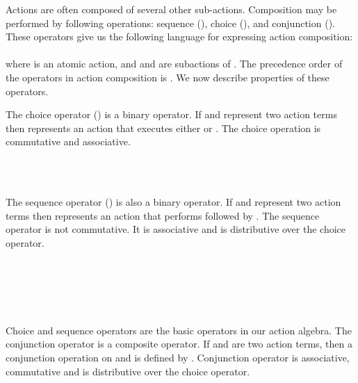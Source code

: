 \documentclass[12pt,journal,letterpaper,onecolumn]{IEEEtran}
\begin{document}
Actions are often composed of several other sub-actions. Composition
may be performed by following operations: sequence (), choice
(), and conjunction (). These operators give us the
following language for
expressing action composition: \\
\indent \\
where  is an atomic action, and  and  are subactions of
.  The precedence order of the operators in action composition is
. We now describe properties of these
operators.

The choice operator () is a binary operator. If  and
 represent two action terms then  represents an
 action  that executes either  or
. The choice operation is commutative and associative.
\begin{center}
\begin{minipage}{4.5in}
\begin{multicols}{2}
 \\
 \\

\end{multicols}
\end{minipage}
\end{center}


The sequence operator () is also a binary operator. If  and
 represent two action terms then  represents an action
that performs  followed by . The sequence operator is not
commutative. It is associative and is distributive over the choice
operator.
\begin{center}
\begin{minipage}{4.5in}
\begin{multicols}{2}
\\
 \\
 \\
\\

\end{multicols}
\end{minipage}
\end{center}

Choice and sequence operators are the basic operators in our action
algebra. The conjunction operator is a composite operator. If 
and  are two action terms, then a conjunction operation on
 and  is defined by . Conjunction operator is associative, commutative
 and is distributive over the choice operator.
\begin{center}
\begin{minipage}{4.5in}
\begin{multicols}{2}
 \\
\\

\end{multicols}
\end{minipage}
\end{center}
\end{document}
